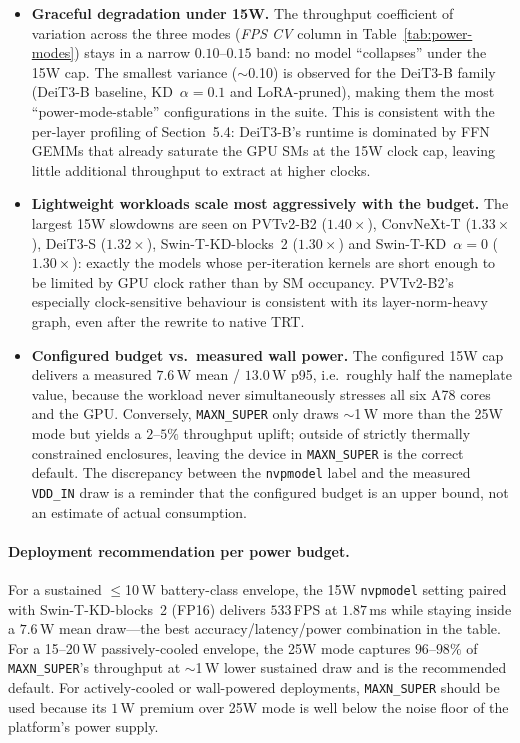 \documentclass[runningheads,a4paper]{llncs}
\begin{document}
\begin{itemize}
    \item \textbf{Graceful degradation under 15W.} The throughput coefficient of variation across the three modes (\textit{FPS CV} column in Table~\ref{tab:power-modes}) stays in a narrow $0.10$--$0.15$ band: no model ``collapses'' under the 15W cap. The smallest variance ($\sim$0.10) is observed for the DeiT3-B family (DeiT3-B baseline, KD~$\alpha{=}0.1$ and LoRA-pruned), making them the most ``power-mode-stable'' configurations in the suite. This is consistent with the per-layer profiling of Section~5.4: DeiT3-B's runtime is dominated by FFN GEMMs that already saturate the GPU SMs at the 15W clock cap, leaving little additional throughput to extract at higher clocks.
    \item \textbf{Lightweight workloads scale most aggressively with the budget.} The largest 15W slowdowns are seen on PVTv2-B2 ($1.40\times$), ConvNeXt-T ($1.33\times$), DeiT3-S ($1.32\times$), Swin-T-KD-blocks~2 ($1.30\times$) and Swin-T-KD~$\alpha{=}0$ ($1.30\times$): exactly the models whose per-iteration kernels are short enough to be limited by GPU clock rather than by SM occupancy. PVTv2-B2's especially clock-sensitive behaviour is consistent with its layer-norm-heavy graph, even after the rewrite to native TRT.
    \item \textbf{Configured budget vs.\ measured wall power.} The configured 15W cap delivers a measured $7.6$\,W mean / $13.0$\,W p95, i.e.~roughly half the nameplate value, because the workload never simultaneously stresses all six A78 cores and the GPU. Conversely, \texttt{MAXN\_SUPER} only draws $\sim$1\,W more than the 25W mode but yields a $2$--$5\%$ throughput uplift; outside of strictly thermally constrained enclosures, leaving the device in \texttt{MAXN\_SUPER} is the correct default. The discrepancy between the \texttt{nvpmodel} label and the measured \texttt{VDD\_IN} draw is a reminder that the configured budget is an upper bound, not an estimate of actual consumption.
\end{itemize}

\paragraph{Deployment recommendation per power budget.} For a sustained $\le$10\,W battery-class envelope, the 15W \texttt{nvpmodel} setting paired with Swin-T-KD-blocks~2 (FP16) delivers $533$\,FPS at $1.87$\,ms while staying inside a $7.6$\,W mean draw---the best accuracy/latency/power combination in the table. For a 15--20\,W passively-cooled envelope, the 25W mode captures $96$--$98\%$ of \texttt{MAXN\_SUPER}'s throughput at $\sim$1\,W lower sustained draw and is the recommended default. For actively-cooled or wall-powered deployments, \texttt{MAXN\_SUPER} should be used because its $1$\,W premium over 25W mode is well below the noise floor of the platform's power supply.
\end{document}
